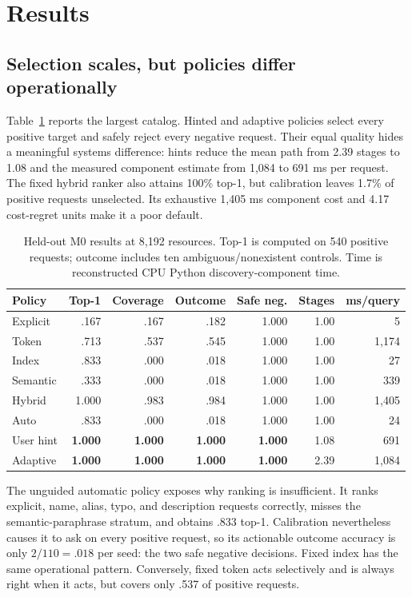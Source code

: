 \section{Results}
\subsection{Selection scales, but policies differ operationally}
Table~\ref{tab:policy} reports the largest catalog. Hinted and adaptive policies
select every positive target and safely reject every negative request. Their
equal quality hides a meaningful systems difference: hints reduce the mean
path from 2.39 stages to 1.08 and the measured component estimate from
1,084 to 691 ms per request. The fixed hybrid ranker also attains 100\% top-1,
but calibration leaves 1.7\% of positive requests unselected. Its exhaustive
1,405 ms component cost and 4.17 cost-regret units make it a poor default.

\begin{table}[H]
\centering
\small
\caption{Held-out M0 results at 8,192 resources. Top-1 is computed on 540
positive requests; outcome includes ten ambiguous/nonexistent controls.
Time is reconstructed CPU Python discovery-component time.}
\label{tab:policy}
\begin{tabular}{lrrrrrr}
\toprule
Policy & Top-1 & Coverage & Outcome & Safe neg. & Stages & ms/query \\
\midrule
Explicit & .167 & .167 & .182 & 1.000 & 1.00 & 5 \\
Token & .713 & .537 & .545 & 1.000 & 1.00 & 1,174 \\
Index & .833 & .000 & .018 & 1.000 & 1.00 & 27 \\
Semantic & .333 & .000 & .018 & 1.000 & 1.00 & 339 \\
Hybrid & 1.000 & .983 & .984 & 1.000 & 1.00 & 1,405 \\
Auto & .833 & .000 & .018 & 1.000 & 1.00 & 24 \\
User hint & \textbf{1.000} & \textbf{1.000} & \textbf{1.000} & \textbf{1.000} & 1.08 & 691 \\
Adaptive & \textbf{1.000} & \textbf{1.000} & \textbf{1.000} & \textbf{1.000} & 2.39 & 1,084 \\
\bottomrule
\end{tabular}
\end{table}

The unguided automatic policy exposes why ranking is insufficient. It ranks
explicit, name, alias, typo, and description requests correctly, misses the
semantic-paraphrase stratum, and obtains .833 top-1. Calibration nevertheless
causes it to ask on every positive request, so its actionable outcome accuracy
is only $2/110=.018$ per seed: the two safe negative decisions. Fixed index has
the same operational pattern. Conversely, fixed token acts selectively and is
always right when it acts, but covers only .537 of positive requests.

